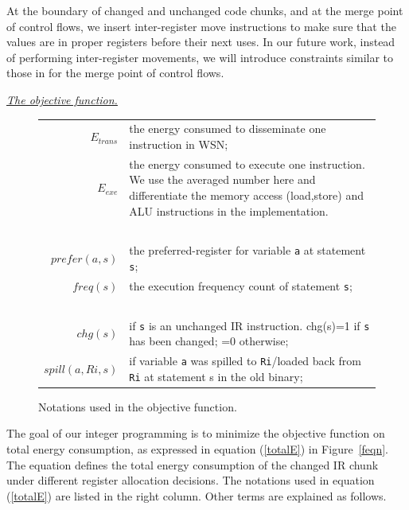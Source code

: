 At the boundary of changed and unchanged code chunks, and at the merge
point of control flows, we insert inter-register move instructions to
make sure that the values are in proper registers before their next
uses. In our future work, instead of performing inter-register
movements, we will introduce constraints similar to those in
\cite{related:ilp} for the merge point of control flows.




{\underline{\em The objective function.}}
\begin{figure}[htbp]
\begin{normalsize}
\begin{center}
\begin{tabular}{r|p{5in}} 
$E_{trans}$ & the energy consumed to disseminate one instruction in WSN; \\
$E_{exe}$ & the energy consumed to execute one instruction.
We use the averaged number here and differentiate the memory access 
(load,store) and ALU instructions in the implementation. \\
~ & \\
$prefer(a, s)$ & the preferred-register for variable {\tt a} at statement {\tt s}; \\
$freq(s)$ & the execution frequency count of statement {\tt s}; \\
~ & \\
$chg(s)$ & if {\tt s} is an unchanged IR instruction.
chg(s)=1 if {\tt s} has been changed; =0 otherwise;\\
$spill(a, Ri, s)$ & if variable {\tt a} was spilled to {\tt Ri}/loaded back from {\tt Ri} 
at statement s in the old binary; 
\end{tabular}
\caption{Notations used in the objective function.}
\label{notation.obj}
\end{center}
\end{normalsize}
\end{figure}
The goal of our integer programming is to minimize the objective
function on total energy consumption, as expressed in equation (\ref{totalE}) in
Figure~\ref{feqn}. The equation defines the total energy consumption of the
changed IR chunk under different register allocation decisions. The notations
used in equation ({\ref{totalE}}) are listed in the right column.
Other terms are explained as follows.


